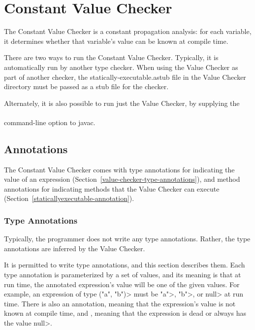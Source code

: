\htmlhr
\chapter{Constant Value Checker\label{value-checker}}

The Constant Value Checker is a constant propagation analysis: for
each variable, it determines whether that variable's value can be
known at compile time.

There are two ways to run the Constant Value Checker.
Typically, it is automatically run by another type checker.
When using the Value Checker as part of another checker, the
statically-executable.astub file in the Value Checker directory must
be passed as a stub file for the checker.

Alternately, it is also possible to run just the Value Checker, by
supplying the \\
 \\
command-line option to javac.


\section{Annotations\label{value-checker-annotations}}

The Constant Value Checker comes with type annotations for indicating the
value of an expression (Section~\ref{value-checker-type-annotations}), and
method annotations for indicating methods that the Value Checker can execute
(Section~\ref{staticallyexecutable-annotation}).


\subsection{Type Annotations\label{value-checker-type-annotations}}

Typically, the programmer does not write any type annotations.  Rather, the
type annotations are inferred by the Value Checker.

It is permitted to write type annotations, and this section describes them.
Each type annotation is parameterized by a set of values, and its meaning
is that at run time, the annotated expression's value will be one of the
given values.  For example, an expression of type 
\<("a", "b")> must be
\<"a">, \<"b">, or \<null> at run time.
There is also an  annotation,
meaning that the expression's value is not known at compile time, and 
, meaning that the expression
is dead or always has the value \<null>.

